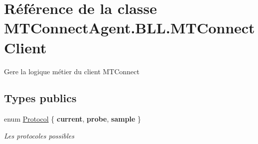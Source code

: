\hypertarget{class_m_t_connect_agent_1_1_b_l_l_1_1_m_t_connect_client}{}\section{Référence de la classe M\+T\+Connect\+Agent.\+B\+L\+L.\+M\+T\+Connect\+Client}
\label{class_m_t_connect_agent_1_1_b_l_l_1_1_m_t_connect_client}


Gere la logique métier du client M\+T\+Connect  


\subsection*{Types publics}
\begin{DoxyCompactItemize}
\item 
enum \mbox{\hyperlink{class_m_t_connect_agent_1_1_b_l_l_1_1_m_t_connect_client_a2f390f74a0ad3ee5147e9438ceed6474}{Protocol}} \{ {\bfseries current}, 
{\bfseries probe}, 
{\bfseries sample}
 \}
\begin{DoxyCompactList}\small\item\em Les protocoles possibles \end{DoxyCompactList}\end{DoxyCompactItemize}
